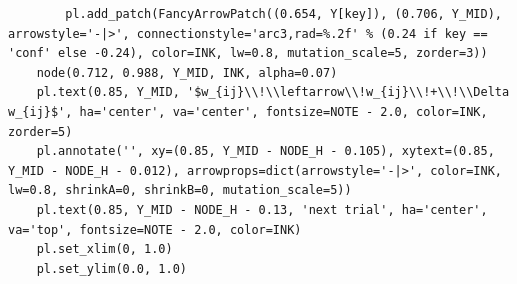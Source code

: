 \documentclass[a4paper,10pt]{article}
\begin{document}
\begin{Verbatim}
        pl.add_patch(FancyArrowPatch((0.654, Y[key]), (0.706, Y_MID), arrowstyle='-|>', connectionstyle='arc3,rad=%.2f' % (0.24 if key == 'conf' else -0.24), color=INK, lw=0.8, mutation_scale=5, zorder=3))
    node(0.712, 0.988, Y_MID, INK, alpha=0.07)
    pl.text(0.85, Y_MID, '$w_{ij}\\!\\leftarrow\\!w_{ij}\\!+\\!\\Delta w_{ij}$', ha='center', va='center', fontsize=NOTE - 2.0, color=INK, zorder=5)
    pl.annotate('', xy=(0.85, Y_MID - NODE_H - 0.105), xytext=(0.85, Y_MID - NODE_H - 0.012), arrowprops=dict(arrowstyle='-|>', color=INK, lw=0.8, shrinkA=0, shrinkB=0, mutation_scale=5))
    pl.text(0.85, Y_MID - NODE_H - 0.13, 'next trial', ha='center', va='top', fontsize=NOTE - 2.0, color=INK)
    pl.set_xlim(0, 1.0)
    pl.set_ylim(0.0, 1.0)


\end{Verbatim}
\end{document}
